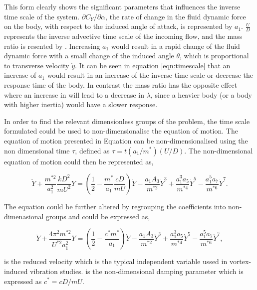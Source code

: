 This form clearly shows the significant parameters that influences the inverse time scale of the system. $\partial C_Y / \partial \alpha $, the rate of change in the fluid dynamic force on the body, with respect to the induced angle of attack, is represented by $a_1$. $\frac{U}{D}$ represents the inverse advective time scale of the incoming flow, and the mass ratio is resented by \mstar. Increasing $a_1$ would result in a rapid change of the fluid dynamic force with a small change of the induced angle $\theta$, which is proportional to transverse velocity $\dot{y}$. It can be seen in equation \ref{eqn:timescale} that an increase of $a_{1}$ would result in an increase of the inverse time scale or decrease the response time of the body. In contrast the mass ratio has the opposite effect where an increase in \mstar will lead to a decrease in $\lambda$, since a heavier body (or a body with higher inertia) would have a slower response. 

In order to find the relevant dimensionless groups of the problem, the time scale formulated could be used to non-dimensionalise the equation of motion. The equation of motion presented in Equation  can be non-dimensionalised using the non dimensional time $\tau$, defined as $\tau=t(a_1/m^*)(U/D)$. The non-dimensional equation of motion could then be represented as, 

 \begin{equation}
 \label{eqn:eom_nondim}
 \ddot{Y} + \frac{m^{*2}}{a_1^2}\frac{kD^2}{mU^2}Y = \left(\frac{1}{2} - \frac{m^*}{a_1}\frac{cD}{mU}\right)\dot{Y} - \frac{a_1A_3}{m^{*2}}\dot{Y}^3 + \frac{a_1^3a_5}{m^{*4}}\dot{Y}^5 - \frac{a_1^5a_7}{m^{*6}}\dot{Y}^7.
 \end{equation}
 
 The equation could be further altered by regrouping the coefficients into non-dimenasional groups and could be expressed as, 
 
  \begin{equation}
  \label{eqn:eom_nondim_regroup}
  \ddot{Y} + \frac{4\pi^{2}m^{*2}}{U^{*2}a_1^2}Y = \left(\frac{1}{2} - \frac{c^*m^*}{a_1}\right)\dot{Y} - \frac{a_1A_3}{m^{*2}}\dot{Y}^3 + \frac{a_1^3a_5}{m^{*4}}\dot{Y}^5 - \frac{a_1^5a_7}{m^{*6}}\dot{Y}^7,
  \end{equation}  

\ustar is the reduced velocity which is the typical independent variable ussed in vortex-induced vibration studies. \cstar is the non-dimensional damping parameter which is expressed as $c^*=cD/mU$. 

